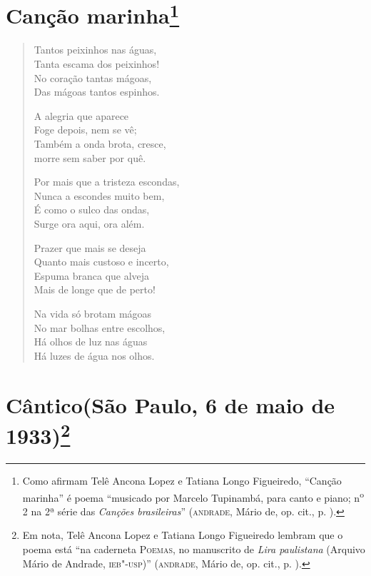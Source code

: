 \pagebreak
\section{Canção marinha\footnote[*]{Como afirmam Telê Ancona Lopez e
  Tatiana Longo Figueiredo, ``Canção marinha'' é poema ``musicado por
  Marcelo Tupinambá, para canto e piano; n\textsuperscript{o} 2 na 2ª
  série das \emph{Canções brasileiras}'' (\textsc{andrade}, Mário de, op. cit.,
  p. ).}}

\begin{verse}
Tantos peixinhos nas águas,\\
Tanta escama dos peixinhos!\\
No coração tantas mágoas,\\
Das mágoas tantos espinhos.

A alegria que aparece\\
Foge depois, nem se vê;\\
Também a onda brota, cresce,\\
morre sem saber por quê.

Por mais que a tristeza escondas,\\
Nunca a escondes muito bem,\\
É como o sulco das ondas,\\
Surge ora aqui, ora além.

Prazer que mais se deseja\\
Quanto mais custoso e incerto,\\
Espuma branca que alveja\\
Mais de longe que de perto!

Na vida só brotam mágoas\\
No mar bolhas entre escolhos,\\
Há olhos de luz nas águas\\
Há luzes de água nos olhos.
\end{verse}

\pagebreak
\section[Cântico]{Cântico\break(São Paulo, 6 de maio de 1933)\footnote[*]{Em nota, Telê Ancona Lopez e Tatiana Longo
  Figueiredo lembram que o poema está ``na caderneta \textsc{Poemas}, no
  manuscrito de \emph{Lira paulistana} (Arquivo Mário de Andrade,
  \textsc{ieb"-usp})'' (\textsc{andrade}, Mário de, op. cit., p. ).}}

